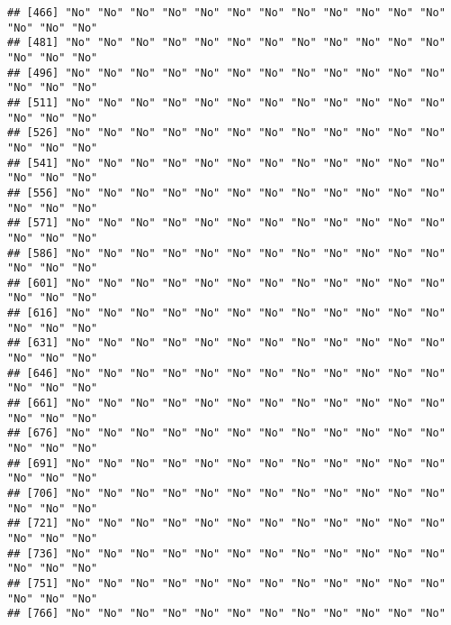 \documentclass[
]{article}
\newenvironment{Shaded}{\begin{snugshade}}{\end{snugshade}}
\newcommand{\CommentTok}[1]{\textcolor[rgb]{0.56,0.35,0.01}{\textit{#1}}}
\newcommand{\DecValTok}[1]{\textcolor[rgb]{0.00,0.00,0.81}{#1}}
\newcommand{\NormalTok}[1]{#1}
\newcommand{\OtherTok}[1]{\textcolor[rgb]{0.56,0.35,0.01}{#1}}
\newcommand{\SpecialCharTok}[1]{\textcolor[rgb]{0.00,0.00,0.00}{#1}}
\newcommand{\StringTok}[1]{\textcolor[rgb]{0.31,0.60,0.02}{#1}}
\begin{document}
\begin{verbatim}
## [466] "No" "No" "No" "No" "No" "No" "No" "No" "No" "No" "No" "No" "No" "No" "No"
## [481] "No" "No" "No" "No" "No" "No" "No" "No" "No" "No" "No" "No" "No" "No" "No"
## [496] "No" "No" "No" "No" "No" "No" "No" "No" "No" "No" "No" "No" "No" "No" "No"
## [511] "No" "No" "No" "No" "No" "No" "No" "No" "No" "No" "No" "No" "No" "No" "No"
## [526] "No" "No" "No" "No" "No" "No" "No" "No" "No" "No" "No" "No" "No" "No" "No"
## [541] "No" "No" "No" "No" "No" "No" "No" "No" "No" "No" "No" "No" "No" "No" "No"
## [556] "No" "No" "No" "No" "No" "No" "No" "No" "No" "No" "No" "No" "No" "No" "No"
## [571] "No" "No" "No" "No" "No" "No" "No" "No" "No" "No" "No" "No" "No" "No" "No"
## [586] "No" "No" "No" "No" "No" "No" "No" "No" "No" "No" "No" "No" "No" "No" "No"
## [601] "No" "No" "No" "No" "No" "No" "No" "No" "No" "No" "No" "No" "No" "No" "No"
## [616] "No" "No" "No" "No" "No" "No" "No" "No" "No" "No" "No" "No" "No" "No" "No"
## [631] "No" "No" "No" "No" "No" "No" "No" "No" "No" "No" "No" "No" "No" "No" "No"
## [646] "No" "No" "No" "No" "No" "No" "No" "No" "No" "No" "No" "No" "No" "No" "No"
## [661] "No" "No" "No" "No" "No" "No" "No" "No" "No" "No" "No" "No" "No" "No" "No"
## [676] "No" "No" "No" "No" "No" "No" "No" "No" "No" "No" "No" "No" "No" "No" "No"
## [691] "No" "No" "No" "No" "No" "No" "No" "No" "No" "No" "No" "No" "No" "No" "No"
## [706] "No" "No" "No" "No" "No" "No" "No" "No" "No" "No" "No" "No" "No" "No" "No"
## [721] "No" "No" "No" "No" "No" "No" "No" "No" "No" "No" "No" "No" "No" "No" "No"
## [736] "No" "No" "No" "No" "No" "No" "No" "No" "No" "No" "No" "No" "No" "No" "No"
## [751] "No" "No" "No" "No" "No" "No" "No" "No" "No" "No" "No" "No" "No" "No" "No"
## [766] "No" "No" "No" "No" "No" "No" "No" "No" "No" "No" "No" "No"
\end{verbatim}

\begin{Shaded}
\end{Shaded}
\end{document}
